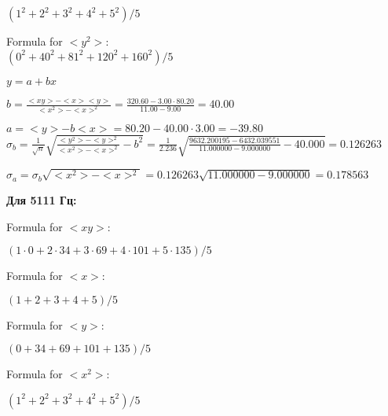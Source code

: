 \documentclass[12pt,a4paper]{article}
\begin{document}
$(1^2 + 2^2 + 3^2 + 4^2 + 5^2) / 5$
\vspace{0.5cm}

Formula for $<y^2>:$
\vspace{0.5cm}\\

$(0^2 + 40^2 + 81^2 + 120^2 + 160^2) / 5$
\vspace{0.5cm}



$y = a + bx$
\vspace{0.5cm}

$b = \frac{<xy> - <x><y>}{<x^2> - <x>^2} = \frac{320.60 - 3.00 \cdot 80.20}{11.00 - 9.00} = 40.00$
\vspace{0.5cm}

$a =<y> - b<x> = 80.20 - 40.00 \cdot 3.00 = -39.80$
\vspace{0.5cm}\\

$\sigma_b = \frac{1}{\sqrt{n}} \sqrt { \frac{<y^2> - <y>^2}{<x^2> - <x>^2}  - b^2} = \frac{1}{2.236} \sqrt {\frac{9632.200195 - 6432.039551}{11.000000 - 9.000000} - 40.000} = 0.126263$
\vspace{0.5cm}

$\sigma_a = \sigma_b \sqrt{<x^2> - <x>^2} = 0.126263 \sqrt{11.000000 - 9.000000} = 0.178563$
\vspace{0.5cm}

\textbf{Для 5111 Гц:}
\vspace{0.5cm}

Formula for $<xy>:$
\vspace{0.5cm}

$(1 \cdot 0 + 2 \cdot 34 + 3 \cdot 69 + 4 \cdot 101 + 5 \cdot 135) / 5$
\vspace{0.5cm}

Formula for $<x>:$
\vspace{0.5cm}

$(1 + 2 + 3 + 4 + 5) / 5$
\vspace{0.5cm}

Formula for $<y>:$
\vspace{0.5cm}

$(0 + 34 + 69 + 101 + 135) / 5$
\vspace{0.5cm}

Formula for $<x^2>$:
\vspace{0.5cm}

$(1^2 + 2^2 + 3^2 + 4^2 + 5^2) / 5$
\vspace{0.5cm}\\
\end{document}
